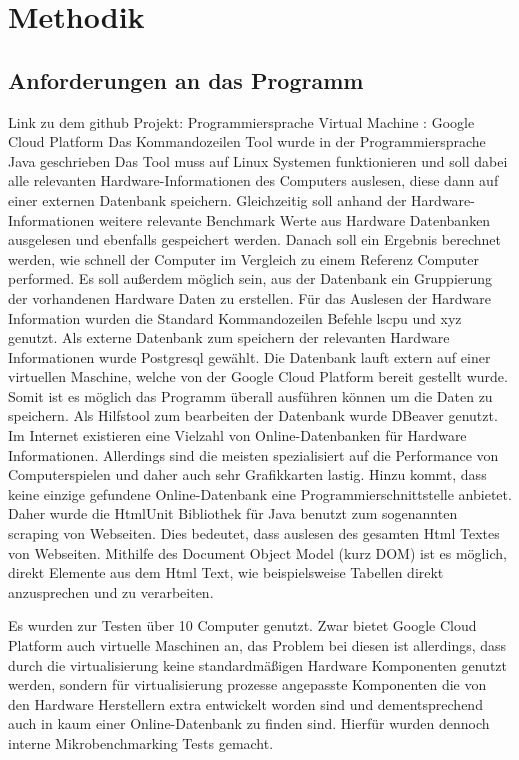 \cleardoublepage
\chapter{Methodik}

\section{Anforderungen an das Programm}
\label{sec:programm}

Link zu dem github Projekt:
Programmiersprache
Virtual Machine : Google Cloud Platform
Das Kommandozeilen Tool wurde in der Programmiersprache Java geschrieben 
Das Tool muss auf Linux Systemen funktionieren und soll dabei alle relevanten Hardware-Informationen des Computers auslesen, diese dann auf einer externen Datenbank speichern. %
Gleichzeitig soll anhand der Hardware-Informationen weitere relevante Benchmark Werte aus Hardware Datenbanken ausgelesen und ebenfalls gespeichert werden. Danach soll ein Ergebnis berechnet werden, wie schnell der Computer im Vergleich zu einem Referenz Computer performed. Es soll außerdem möglich sein, aus der Datenbank ein Gruppierung der vorhandenen Hardware Daten zu erstellen.
Für das Auslesen der Hardware Information wurden die Standard Kommandozeilen Befehle lscpu und xyz genutzt.
Als externe Datenbank zum speichern der relevanten Hardware Informationen wurde Postgresql gewählt. %
Die Datenbank lauft extern auf einer virtuellen Maschine, welche von der Google Cloud Platform bereit gestellt wurde. Somit ist es möglich das Programm überall ausführen können um die Daten zu speichern. Als Hilfstool zum bearbeiten der Datenbank wurde DBeaver genutzt. %
Im Internet existieren eine Vielzahl von Online-Datenbanken für Hardware Informationen. Allerdings sind die meisten spezialisiert auf die Performance von Computerspielen und daher auch sehr Grafikkarten lastig. Hinzu kommt, dass keine einzige gefundene Online-Datenbank eine Programmierschnittstelle anbietet. Daher wurde die HtmlUnit Bibliothek für Java benutzt zum sogenannten scraping von Webseiten. Dies bedeutet, dass auslesen des gesamten Html Textes von Webseiten. Mithilfe des Document Object Model (kurz DOM) ist es möglich, direkt Elemente aus dem Html Text, wie beispielsweise Tabellen direkt anzusprechen und zu verarbeiten. %

Es wurden zur Testen über 10 Computer genutzt. Zwar bietet Google Cloud Platform auch virtuelle Maschinen an, das Problem bei diesen ist allerdings, dass durch die virtualisierung keine standardmäßigen Hardware Komponenten genutzt werden, sondern für virtualisierung prozesse angepasste Komponenten die von den Hardware Herstellern extra entwickelt worden sind und dementsprechend auch in kaum einer Online-Datenbank zu finden sind. Hierfür wurden dennoch interne Mikrobenchmarking Tests gemacht.

